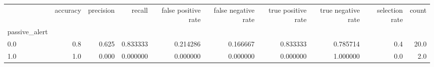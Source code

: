 \begin{tabular}{lrrrrrrrrr}
\toprule
{} &  accuracy &  precision &    recall &  false positive rate &  false negative rate &  true positive rate &  true negative rate &  selection rate &  count \\
passive\_alert &           &            &           &                      &                      &                     &                     &                 &        \\
\midrule
0.0           &       0.8 &      0.625 &  0.833333 &             0.214286 &             0.166667 &            0.833333 &            0.785714 &             0.4 &   20.0 \\
1.0           &       1.0 &      0.000 &  0.000000 &             0.000000 &             0.000000 &            0.000000 &            1.000000 &             0.0 &    2.0 \\
\bottomrule
\end{tabular}
